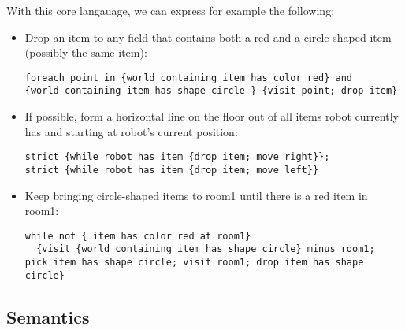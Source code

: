With this core langauage, we can express for example the following:
\begin{itemize}
	\item Drop an item to any field that contains both a red and a circle-shaped item
    (possibly the same item):
    \begin{lstlisting}
foreach point in {world containing item has color red} and
{world containing item has shape circle } {visit point; drop item}
	   \end{lstlisting}

  \item If possible, form a horizontal line on the floor out of all items robot
    currently has and starting at robot's current position:
    \begin{lstlisting}
strict {while robot has item {drop item; move right}};
strict {while robot has item {drop item; move left}}
    \end{lstlisting}

	\item Keep bringing circle-shaped items to room1 until there is a red item in room1:
    \begin{lstlisting}
while not { item has color red at room1}
  {visit {world containing item has shape circle} minus room1;
pick item has shape circle; visit room1; drop item has shape circle}
    \end{lstlisting}
\end{itemize}


\subsection{Semantics}
